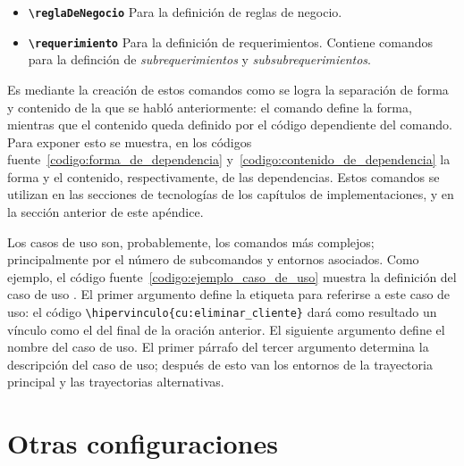 \begin{itemize}
\begin{itemize}
      \item \textbf{\texttt{{\textbackslash}reglaDeNegocio}}
        Para la definición de reglas de negocio.

      \item \textbf{\texttt{{\textbackslash}requerimiento}}
        Para la definición de requerimientos. Contiene comandos para la
        definción de \textit{subrequerimientos} y \textit{subsubrequerimientos}.

    \end{itemize}

\end{itemize}


Es mediante la creación de estos comandos como se logra la separación de forma
y contenido de la que se habló anteriormente: el comando define la forma,
mientras que el contenido queda definido por el código dependiente del comando.
Para exponer esto se muestra, en los códigos
fuente~\ref{codigo:forma_de_dependencia} y~\ref{codigo:contenido_de_dependencia}
la forma y el contenido, respectivamente, de las dependencias. Estos comandos
se utilizan en las secciones de tecnologías de los capítulos de
implementaciones, y en la sección anterior de este apéndice.



Los casos de uso son, probablemente, los comandos más complejos; principalmente
por el número de subcomandos y entornos asociados. Como ejemplo, el código
fuente~\ref{codigo:ejemplo_caso_de_uso} muestra la definición del caso de uso
. El primer argumento define la etiqueta para
referirse a este caso de uso: el código
\verb|\hipervinculo{cu:eliminar_cliente}| dará como resultado un vínculo como
el del final de la oración anterior. El siguiente argumento define el nombre
del caso de uso. El primer párrafo del tercer argumento determina la
descripción del caso de uso; después de esto van los entornos de la trayectoria
principal y las trayectorias alternativas.


\section{Otras configuraciones}

